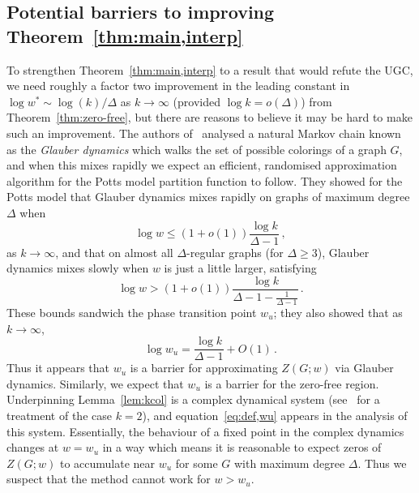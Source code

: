 \subsection{Potential barriers to improving Theorem~\ref{thm:main,interp}}\label{sec:barrers,interp}
%
To strengthen Theorem~\ref{thm:main,interp} to a result that would refute the UGC, we need roughly a factor two improvement in the leading constant in $\log w^* \sim \log (k)/\Delta$ as $k\to\infty$ (provided $\log k=o(\Delta)$) from Theorem~\ref{thm:zero-free}, but there are reasons to believe it may be hard to make such an improvement. 
%
The authors of~\cite{BGP16} analysed a natural Markov chain known as the \emph{Glauber dynamics} which walks the set of possible colorings of a graph $G$, and when this mixes rapidly we expect an efficient, randomised approximation algorithm for the Potts model partition function to follow.
They showed for the Potts model that Glauber dynamics mixes rapidly on graphs of maximum degree $\Delta$ when 
\[
\log w \le (1+o(1))\frac{\log k}{\Delta-1}\,,
\]
as $k\to\infty$, and that on almost all $\Delta$-regular graphs (for $\Delta\ge 3$), Glauber dynamics mixes slowly when $w$ is just a little larger, satisfying
\[
\log w > (1+o(1))\frac{\log k}{\Delta-1-\frac{1}{\Delta-1}}\,.
\]
These bounds sandwich the phase transition point $w_u$; they also showed that as $k\to\infty$, 
\[
\log w_u = \frac{\log k}{\Delta-1} + O(1)\,.
\]
Thus it appears that $w_u$ is a barrier for approximating $Z(G;w)$ via Glauber dynamics. 
%
Similarly, we expect that $w_u$ is a barrier for the zero-free region. 
Underpinning Lemma~\ref{lem:kcol} is a complex dynamical system (see~\cite{PR18} for a treatment of the case $k=2$), and equation~\eqref{eq:def,wu} appears in the analysis of this system.
Essentially, the behaviour of a fixed point in the complex dynamics changes at $w=w_u$ in a way which means it is reasonable to expect zeros of $Z(G;w)$ to accumulate near $w_u$ for some $G$ with maximum degree $\Delta$. 
Thus we suspect that the method cannot work for $w>w_u$. 
%
%
